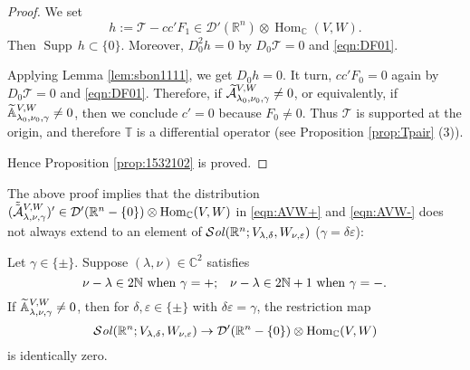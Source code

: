 \begin{proof}
We set
\[
   h:={\mathcal{T}}- c c' F_1
  \in 
  {\mathcal{D}}'({\mathbb{R}}^n)
    \otimes 
    \operatorname{Hom}_{{\mathbb{C}}}(V,W). 
\]
Then ${\operatorname{Supp}}\, h \subset \{0\}$.  
Moreover, 
$D_0^2 h =0$
 by $D_0 {\mathcal{T}}=0$ and \eqref{eqn:DF01}.  



Applying Lemma \ref{lem:sbon1111}, 
 we get $D_0 h=0$.  
It turn, 
 $c c' F_0=0$
 again by $D_0 {\mathcal{T}}=0$
 and \eqref{eqn:DF01}.  
Therefore,
 if $\Atcal {\lambda_0} {\nu_0} \gamma {V,W} \ne 0$,
 or equivalently,
 if $\Atbb {\lambda_0} {\nu_0} \gamma {V,W} \ne 0$, 
 then we conclude $c'=0$
 because $F_0 \ne 0$.  
Thus ${\mathcal{T}}$ is supported at the origin, 
 and therefore ${\mathbb{T}}$ is a differential operator
 (see Proposition \ref{prop:Tpair} (3)).  

Hence Proposition \ref{prop:1532102} is proved.  
\end{proof}

The above proof implies 
 that the distribution $(\Attcal \lambda \nu \gamma {V,W})' \in {\mathcal{D}}'({\mathbb{R}}^n \setminus \{0\}) \otimes {\operatorname{Hom}}_{\mathbb{C}}(V,W)$
 in \eqref{eqn:AVW+} and \eqref{eqn:AVW-} does not always extend
 to an element of ${\mathcal{S}}{\it{ol}}({\mathbb{R}}^n; V_{\lambda, \delta}, 
                            W_{\nu, \varepsilon})$
 ($\gamma = \delta \varepsilon$):

\begin{proposition}
\label{prop:20170213}
Let $\gamma \in \{\pm\}$. 
Suppose $(\lambda, \nu)\in {\mathbb{C}}^2$ satisfies
\[
  \text{
  $\nu-\lambda \in 2{\mathbb{N}}$
  when $\gamma =+;$
  \,\,
  $\nu-\lambda \in 2{\mathbb{N}}+1$
  when $\gamma =-$.  
 }
\]
If $\Atbb \lambda \nu \gamma {V,W} \ne 0$, 
 then for $\delta, \varepsilon \in \{ \pm \}$
 with $\delta \varepsilon =\gamma$, 
 the restriction map
\[
   {\mathcal{S}}{\it{ol}}({\mathbb{R}}^n; V_{\lambda, \delta}, 
                            W_{\nu, \varepsilon})
   \to 
   {\mathcal{D}}'({\mathbb{R}}^n \setminus \{0\})
    \otimes 
    \operatorname{Hom}_{{\mathbb{C}}}(V,W)
\]
 is identically zero.  
\end{proposition}


